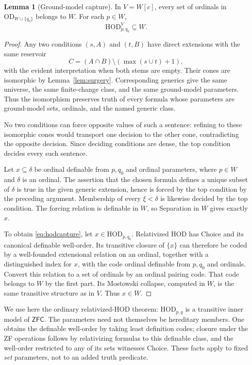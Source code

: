 \documentclass[11pt,letterpaper]{article}
\theoremstyle{definition}
\newtheorem{lemma}[definition]{Lemma}
\numberwithin{equation}{section}
\newcommand{\ZFC}{\mathsf{ZFC}}
\newcommand{\HOD}{\mathrm{HOD}}
\newcommand{\OD}{\mathrm{OD}}
\begin{document}
\begin{lemma}[Ground-model capture]\label{lem:capture}
In $V=W[c]$, every set of ordinals in $\OD_{W\cup\{q_0\}}$ belongs to $W$. For each $p\in W$,
\[
 \HOD_{p,q_0}^{V}\subseteq W.
 \label{eq:hodcapture}\tag{15}
\]
\end{lemma}

\begin{proof}
Any two conditions $(s,A)$ and $(t,B)$ have direct extensions with the same reservoir
\[
 C=(A\cap B)\setminus(\max(s\cup t)+1),
\]
with the evident interpretation when both stems are empty. Their cones are isomorphic by Lemma~\ref{lem:surgery}. Corresponding generics give the same universe, the same finite-change class, and the same ground-model parameters. Thus the isomorphism preserves truth of every formula whose parameters are ground-model sets, ordinals, and the named generic class.

No two conditions can force opposite values of such a sentence: refining to these isomorphic cones would transport one decision to the other cone, contradicting the opposite decision. Since deciding conditions are dense, the top condition decides every such sentence.

Let $x\subseteq\delta$ be ordinal definable from $p,q_0$ and ordinal parameters, where $p\in W$ and $\delta$ is an ordinal. The assertion that the chosen formula defines a unique subset of $\delta$ is true in the given generic extension, hence is forced by the top condition by the preceding argument. Membership of every $\xi<\delta$ is likewise decided by the top condition. The forcing relation is definable in $W$, so Separation in $W$ gives exactly $x$.

To obtain \eqref{eq:hodcapture}, let $x\in\HOD_{p,q_0}$. Relativized HOD has Choice and its canonical definable well-order. Its transitive closure of $\{x\}$ can therefore be coded by a well-founded extensional relation on an ordinal, together with a distinguished index for $x$, with the code ordinal definable from $p,q_0$ and ordinals. Convert this relation to a set of ordinals by an ordinal pairing code. That code belongs to $W$ by the first part. Its Mostowski collapse, computed in $W$, is the same transitive structure as in $V$. Thus $x\in W$.
\end{proof}

We use here the ordinary relativized-HOD theorem: $\HOD_{p,q}$ is a transitive inner model of $\ZFC$. The parameters need not themselves be hereditary members. One obtains the definable well-order by taking least definition codes; closure under the ZF operations follows by relativizing formulas to this definable class, and the well-order restricted to any of its sets witnesses Choice. These facts apply to fixed \emph{set} parameters, not to an added truth predicate.
\end{document}
